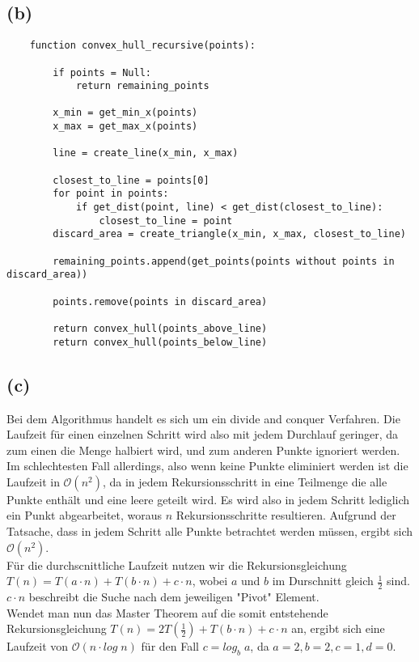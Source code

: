 \documentclass[a4paper]{scrartcl}
\begin{document}
\subsection*{(b)}
\begin{lstlisting}
	function convex_hull_recursive(points):
		
		if points = Null:
			return remaining_points
			
		x_min = get_min_x(points)
		x_max = get_max_x(points)
		
		line = create_line(x_min, x_max)
		
		closest_to_line = points[0]
		for point in points:
			if get_dist(point, line) < get_dist(closest_to_line):
				closest_to_line = point
		discard_area = create_triangle(x_min, x_max, closest_to_line)
		
		remaining_points.append(get_points(points without points in discard_area))
		
		points.remove(points in discard_area)
		
		return convex_hull(points_above_line)
		return convex_hull(points_below_line)
\end{lstlisting}


\subsection*{(c)}
Bei dem Algorithmus handelt es sich um ein divide and conquer Verfahren. Die Laufzeit für einen einzelnen Schritt wird also mit jedem Durchlauf geringer, da zum einen die Menge halbiert wird, und zum anderen Punkte ignoriert werden.\\
Im schlechtesten Fall allerdings, also wenn keine Punkte eliminiert werden ist die Laufzeit in $\mathcal{O}(n^2)$, da in jedem Rekursionsschritt in eine Teilmenge die alle Punkte enthält und eine leere geteilt wird.
Es wird also in jedem Schritt lediglich ein Punkt abgearbeitet, woraus $n$ Rekursionsschritte resultieren. Aufgrund der Tatsache, dass in jedem Schritt alle Punkte betrachtet werden müssen, ergibt sich $\mathcal{O}(n^2)$.\\
Für die durchscnittliche Laufzeit nutzen wir die Rekursionsgleichung $T(n) = T(a \cdot n) + T(b \cdot n) + c \cdot n$, wobei $a$ und $b$ im Durschnitt gleich $\frac{1}{2}$ sind. $c \cdot n$ beschreibt die Suche nach dem jeweiligen "Pivot" Element. \\
Wendet man nun das Master Theorem auf die somit entstehende  Rekursionsgleichung $T(n) = 2T(\frac{1}{2}) + T(b \cdot n) + c \cdot n$ an, ergibt sich eine Laufzeit von $\mathcal{O}(n \cdot log\;n)$ für den Fall $c = log_b\;a$, da $a = 2, b=2, c = 1, d = 0$.
\end{document}
